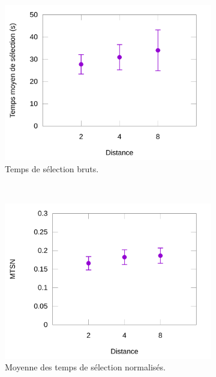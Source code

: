	\begin{figure}[htbp]
		\begin{subfigure}[t]{0.49\textwidth}
			\centering
			\includegraphics[width=\textwidth]{figures/ch5/ampTimeRes}
			\caption{Temps de sélection bruts.}
			\label{fig:ampTimeRes}
		\end{subfigure}
		~
		\begin{subfigure}[t]{0.49\textwidth}
			\centering
			\includegraphics[width=\textwidth]{figures/ch5/normTimes}
			\caption{Moyenne des temps de sélection normalisés.}
			\label{fig:normTimes}
		\end{subfigure}
		~
		\begin{subfigure}[t]{0.49\textwidth}
			\centering

\end{subfigure}
\end{figure}
